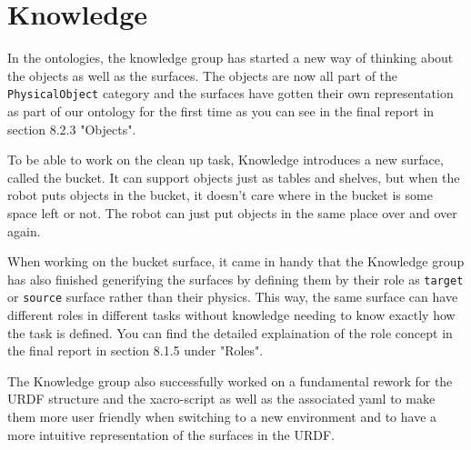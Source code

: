 \documentclass[main.tex]{subfiles}
\begin{document}
	
	\chapter{Knowledge}

In the ontologies, the knowledge group has started a new way of thinking about the objects as well as the surfaces. The objects are now all part of the \texttt{PhysicalObject} category and the surfaces have gotten their own representation as part of our ontology for the first time as you can see in the final report in section 8.2.3 "Objects".

To be able to work on the clean up task, Knowledge introduces a new surface, called the bucket. It can support objects just as tables and shelves, but when the robot puts objects in the bucket, it doesn't care where in the bucket is some space left or not. The robot can just put objects in the same place over and over again.

When working on the bucket surface, it came in handy that the Knowledge group has also finished generifying the surfaces by defining them by their role as \texttt{target} or \texttt{source} surface rather than their physics. This way, the same surface can have different roles in different tasks without knowledge needing to know exactly how the task is defined. You can find the detailed explaination of the role concept in the final report in section 8.1.5 under "Roles".

The Knowledge group also successfully worked on a fundamental rework for the URDF structure and the xacro-script as well as the associated yaml to make them more user friendly when switching to a new environment and to have a more intuitive representation of the surfaces in the URDF.
	
\end{document}
